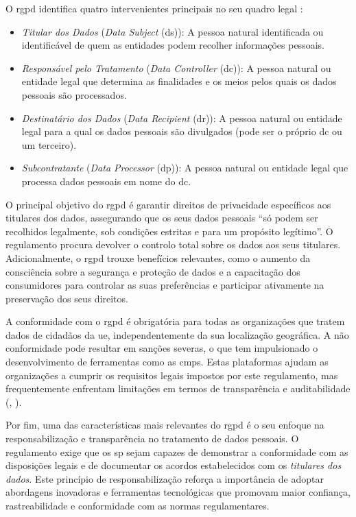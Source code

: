 O \acrshort{rgpd} identifica quatro intervenientes principais no seu quadro legal \citep{gdpr2016}:  
\begin{itemize}
    \item \textit{Titular dos Dados} (\textit{Data Subject} (\acrshort{ds})): A pessoa natural identificada ou identificável de quem as entidades podem recolher informações pessoais.  
    \item \textit{Responsável pelo Tratamento} (\textit{Data Controller} (\acrshort{dc})): A pessoa natural ou entidade legal que determina as finalidades e os meios pelos quais os dados pessoais são processados.  
    \item \textit{Destinatário dos Dados} (\textit{Data Recipient} (\acrshort{dr})): A pessoa natural ou entidade legal para a qual os dados pessoais são divulgados (pode ser o próprio \acrshort{dc} ou um terceiro).  
    \item \textit{Subcontratante} (\textit{Data Processor} (\acrshort{dp})): A pessoa natural ou entidade legal que processa dados pessoais em nome do \acrshort{dc}.
\end{itemize}

O principal objetivo do \acrshort{rgpd} é garantir direitos de privacidade específicos aos titulares dos dados, assegurando que os seus dados pessoais “só podem ser recolhidos legalmente, sob condições estritas e para um propósito legítimo”. O regulamento procura devolver o controlo total sobre os dados aos seus titulares. Adicionalmente, o \acrshort{rgpd} trouxe benefícios relevantes, como o aumento da consciência sobre a segurança e proteção de dados e a capacitação dos consumidores para controlar as suas preferências e participar ativamente na preservação dos seus direitos.

A conformidade com o \acrshort{rgpd} é obrigatória para todas as organizações que tratem dados de cidadãos da \acrshort{ue}, independentemente da sua localização geográfica. A não conformidade pode resultar em sanções severas, o que tem impulsionado o desenvolvimento de ferramentas como as \acrshort{cmp}s. Estas plataformas ajudam as organizações a cumprir os requisitos legais impostos por este regulamento, mas frequentemente enfrentam limitações em termos de transparência e auditabilidade (\cite{ribeiro2025assessing}, \cite{ramos2019privacy}).

Por fim, uma das características mais relevantes do \acrshort{rgpd} é o seu enfoque na responsabilização e transparência no tratamento de dados pessoais. O regulamento exige que os \acrfull{sp} sejam capazes de demonstrar a conformidade com as disposições legais e de documentar os acordos estabelecidos com os \textit{titulares dos dados}. Este princípio de responsabilização reforça a importância de adoptar abordagens inovadoras e ferramentas tecnológicas que promovam maior confiança, rastreabilidade e conformidade com as normas regulamentares.

